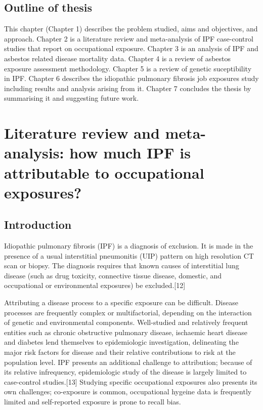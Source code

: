\documentclass[12pt,a4paper,]{report}
\begin{document}
\hypertarget{outline-of-thesis}{%
\section{Outline of thesis}\label{outline-of-thesis}}

This chapter (Chapter 1) describes the problem studied, aims and
objectives, and approach. Chapter 2 is a literature review and
meta-analysis of IPF case-control studies that report on occupational
exposure. Chapter 3 is an analysis of IPF and asbestos related disease
mortality data. Chapter 4 is a review of asbestos exposure assessment
methodology. Chapter 5 is a review of genetic suceptibility in IPF.
Chapter 6 describes the idiopathic pulmonary fibrosis job exposures
study including results and analysis arising from it. Chapter 7
concludes the thesis by summarising it and suggesting future work.

\hypertarget{literature-review-and-meta-analysis-how-much-ipf-is-attributable-to-occupational-exposures}{%
\chapter{Literature review and meta-analysis: how much IPF is
attributable to occupational
exposures?}\label{literature-review-and-meta-analysis-how-much-ipf-is-attributable-to-occupational-exposures}}

\hypertarget{introduction}{%
\section{Introduction}\label{introduction}}

Idiopathic pulmonary fibrosis (IPF) is a diagnosis of exclusion. It is
made in the presence of a usual interstitial pneumonitis (UIP) pattern
on high resolution CT scan or biopsy. The diagnosis requires that known
causes of interstitial lung disease (such as drug toxicity, connective
tissue disease, domestic, and occupational or environmental exposures)
be excluded.{[}12{]}

Attributing a disease process to a specific exposure can be difficult.
Disease processes are frequently complex or multifactorial, depending on
the interaction of genetic and environmental components. Well-studied
and relatively frequent entities such as chronic obstructive pulmonary
disease, ischaemic heart disease and diabetes lend themselves to
epidemiologic investigation, delineating the major risk factors for
disease and their relative contributions to risk at the population
level. IPF presents an additional challenge to attribution; because of
its relative infrequency, epidemiologic study of the disease is largely
limited to case-control studies.{[}13{]} Studying specific occupational
exposures also presents its own challenges; co-exposure is common,
occupational hygeine data is frequently limited and self-reported
exposure is prone to recall bias.
\end{document}
